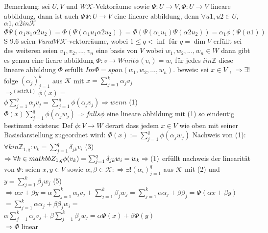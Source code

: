 \documentclass[11pt]{article}
\begin{document}
\section{}
Bemerkung: sei $U, V$ und $W \mathcal{K}$-Vektoräume sowie $\Psi : U\rightarrow V , \Phi : U\rightarrow V$ lineare abbildung, dann ist auch $\Phi\dot\Psi: U\rightarrow V$ eine lineare abbildung, denn 
$\forall u1, u2 \in U$, $\alpha1 , \alpha2 in \mathcal{K}$ 
$\Phi\dot\Psi(\alpha_1 u_1 \alpha2 u_2)=\Phi(\Psi(\alpha_1 u_1 \alpha2 u_2))=\Phi(\Psi(\alpha_1 u_1)\Psi( \alpha2 u_2))= \alpha_1 \phi(\Psi(u1)) $
S 9.6 seien $V und W \mathcal{K}$-vektorräume, wobei $1\leq q< \inf$ für $q= \dim V$ erfüllt sei des weiteren seien $v_1, v_2, ..., v_n$ eine basis von $V$ wobei $w_1, w_2, ...,w_n \in W$
dann gibt es genau eine lieare abbildung $\Phi :v\rightarrow W mit \phi (v_i)=w_i$ für jedes $i in \mathbb{Z}$
diese lineare abbildung $\Phi$ erfüllt $Im \Phi = span(w_1,w_2,...,w_n)$.
beweis: sei $x \in V$ , $\Rightarrow \exists !$ folge $(\alpha_j)_{j=1}^k$ aus $\mathcal{K}$ mit $x= \sum _{j=1}^k {\alpha_jv_j}$\\
$\Rightarrow^(satz9.1)\phi(x) =$\\
$\phi \sum _{j=1}^q {\alpha_jv_j}= \sum _{j=1}^q {\phi(\alpha_jv_j)}\Rightarrow wenn$ (1)\\
$\Phi (x)\sum _{j=1}^q {\phi(\alpha_jw_j)} \Rightarrow falls \phi$ eine lineare abbildung mit (1) so eindeutig bestimmt
existens: Def $\phi :V\rightarrow W$ derart dass jedem $x \in V$ wie oben mit seiner Basisdarstellung zugeordnet wird: 
$\Phi(x):= \sum _{j=1}^q {\phi(\alpha_jw_j)}$
Nachweis von (1): $\forall k in \mathbb{Z}_{1,q}: v_k=\sum _{j=1}^q \delta_{jk}v_i$     (3)
$\Rightarrow \forall k \in \\mathbb{Z}_{1,q}\phi(v_k)=\sum _{j=1}^q\delta_{jk}w_i= w_k \Rightarrow (1)$ erfüllt
nachweis der linearität von $\Phi$:
seien $x,y \in  V$ sowie $\alpha,\beta \in \mathcal{K} : \Rightarrow \exists ! (\alpha_i)_{j=1}^q$ aus $\mathcal{K}$ mit (2) und $y= \sum _{j=1}^k {\beta_jw_j}$ (5)\\
$\Rightarrow \alpha x +\beta y= \alpha \sum _{j=1}^k {\alpha_jv_j} + \sum _{j=1}^k {\beta_jw_j}= \sum _{j=1}^k {\alpha \alpha_j+\beta \beta_j}= \Phi(\alpha x+ \beta y)$\\
$= \sum _{j=1}^k {\alpha \alpha_j+\beta \beta_j}w_i=$\\ 
$\alpha \sum _{j=1}^k \alpha_jv_j+\beta \sum _{j=1}^k {\beta_jw_j}= \alpha \Phi(x)+\beta \Phi (y)$\\
$\Rightarrow \Phi$ linear\\
\end{document}
